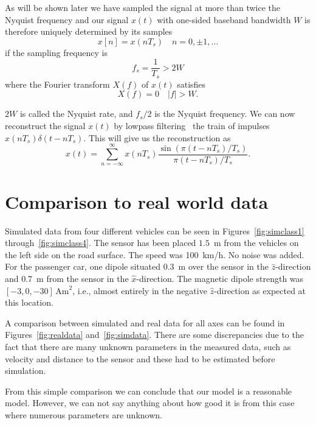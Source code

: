 As will be shown later we have sampled the signal at more than twice the Nyquist frequency and our signal $x(t)$ with one-sided baseband bandwidth $W$ is therefore uniquely determined by its samples
\begin{equation}
 x[n] = x(nT_s)\quad  n=0,\pm1, \ldots
\end{equation}
if the sampling frequency is
\begin{equation}
 f_s = \frac{1}{T_s} > 2W
\end{equation}
where the Fourier transform $X(f)$ of $x(t)$ satisfies
\begin{equation}
X(f)=0\quad |f|>W.
\end{equation}

$2W$ is called the Nyquist rate, and $f_s/2$ is the Nyquist frequency. We can now reconstruct the signal $x(t)$ by lowpass filtering~\cite{ali} the train of impulses \mbox{$x(nT_s)\delta{}(t-nT_s)$.} This will give us the reconstruction as
\begin{equation}
 x(t) = \sum_{n=-\infty}^{\infty} x(nT_s) \frac{\sin{\left(\pi{}(t-nT_s)/T_s\right)}}{\pi{}(t-nT_s)/T_s}.
\end{equation}

\section{Comparison to real world data} %
Simulated data from four different vehicles can be seen in \mbox{Figures \ref{fig:simclass1}} \mbox{through \ref{fig:simclass4}}. The sensor has been placed \mbox{$1.5$ m} from the vehicles on the left side on the road surface. The speed was \mbox{100 km/h.} No noise was added. For the passenger car, one dipole situated 0.3~m over the sensor in the $\hat{z}$-direction and 0.7~m from the sensor in the $\hat{x}$-direction. The magnetic dipole strength was $[-3,0,-30]\,\text{Am}^2$, i.e., almost entirely in the negative $\hat{z}$-direction as expected at this location.

A comparison between simulated and real data for all axes can be found in Figures~\ref{fig:realdata} and~\ref{fig:simdata}. There are some discrepancies due to the fact that there are many unknown parameters in the measured data, such as velocity and distance to the sensor and these had to be estimated before simulation.

From this simple comparison we can conclude that our model is a reasonable model. However, we can not say anything about how good it is from this case where numerous parameters are unknown.

